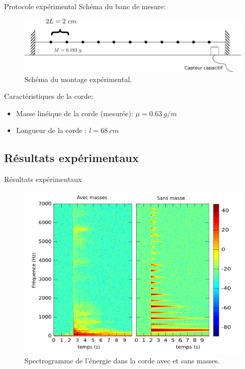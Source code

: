 \documentclass[xcolor=x11names,compress]{beamer}
\renewcommand{\(}{\begin{columns}}
\renewcommand{\)}{\end{columns}}
\newcommand{\<}[1]{\begin{column}{#1}}
\renewcommand{\>}{\end{column}}
\begin{document}
\begin{frame}{Protocole expérimental}
Schéma du banc de mesure:
\begin{figure}[!h]\centering
\includegraphics[scale=0.4]{./figures/schema_cordel_sans_tension.png}
\caption*{ \scriptsize Schéma du montage expérimental.}
\label{schema_cordel}
\end{figure}

Caractéristiques de la corde:
\begin{itemize}
\item Masse linéique de la corde (mesurée): $\mu = 0.63 ~g/m$
\item Longueur de la corde : $l=68 ~cm$
\end{itemize}

\end{frame}

\subsection{Résultats expérimentaux}
\begin{frame}{Résultats expérimentaux}

\begin{figure}[!h]\centering
\includegraphics[scale=0.45]{./figures/spectrogram_nue.png}
\caption*{\scriptsize Spectrogramme de l'énergie dans la corde avec et sans masses.}
\end{figure} 

\end{frame}
\end{document}
